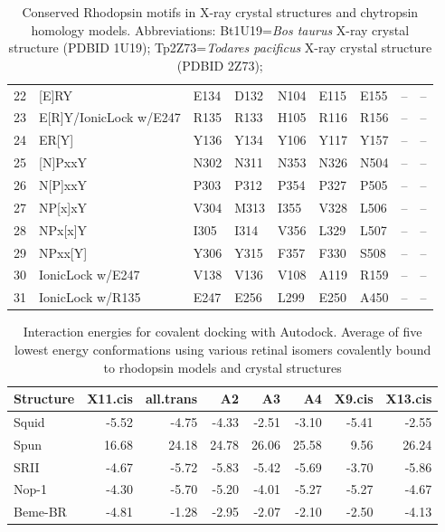 \begin{table}[tbp]
\begin{tabular}{rllllllll}
   \hline
22 & [E]RY & E134 & D132 & N104 & E115 & E155 & -- & -- \\ 
  23 & E[R]Y/IonicLock w/E247 & R135 & R133 & H105 & R116 & R156 & -- & -- \\ 
  24 & ER[Y] & Y136 & Y134 & Y106 & Y117 & Y157 & -- & -- \\ 
   \hline
25 & [N]PxxY & N302 & N311 & N353 & N326 & N504 & -- & -- \\ 
  26 & N[P]xxY & P303 & P312 & P354 & P327 & P505 & -- & -- \\ 
  27 & NP[x]xY & V304 & M313 & I355 & V328 & L506 & -- & -- \\ 
  28 & NPx[x]Y & I305 & I314 & V356 & L329 & L507 & -- & -- \\ 
  29 & NPxx[Y] & Y306 & Y315 & F357 & F330 & S508 & -- & -- \\ 
   \hline
30 & IonicLock w/E247 & V138 & V136 & V108 & A119 & R159 & -- & -- \\ 
  31 & IonicLock w/R135 & E247 & E256 & L299 & E250 & A450 & -- & -- \\ 
   \hline
\hline
\end{tabular}
\caption[Locations of key residues in rhodopsin structural motifs]{Conserved Rhodopsin motifs in X-ray crystal structures and chytropsin homology models. Abbreviations: Bt1U19=\textit{Bos taurus} X-ray crystal structure (PDBID 1U19); Tp2Z73=\textit{Todares pacificus} X-ray crystal structure (PDBID 2Z73);} 
\label{tab:ChRhodS_residues}
\end{table}
\begin{table}[tbp]
\centering
\begin{tabular}{lrrrrrrr}
  \hline
\hline
Structure & X11.cis & all.trans & A2 & A3 & A4 & X9.cis & X13.cis \\ 
  \hline
Squid & -5.52 & -4.75 & -4.33 & -2.51 & -3.10 & -5.41 & -2.55 \\ 
  Spun & 16.68 & 24.18 & 24.78 & 26.06 & 25.58 & 9.56 & 26.24 \\ 
  SRII & -4.67 & -5.72 & -5.83 & -5.42 & -5.69 & -3.70 & -5.86 \\ 
  Nop-1 & -4.30 & -5.70 & -5.20 & -4.01 & -5.27 & -5.27 & -4.67 \\ 
  Beme-BR & -4.81 & -1.28 & -2.95 & -2.07 & -2.10 & -2.50 & -4.13 \\ 
   \hline
\hline
\end{tabular}
\caption[Interaction energies for covalent docking]{Interaction energies for covalent docking with Autodock. Average of five lowest energy conformations using various retinal isomers covalently bound to rhodopsin models and crystal structures} 
\label{tab:ChRhodS_CovDock}
\end{table}